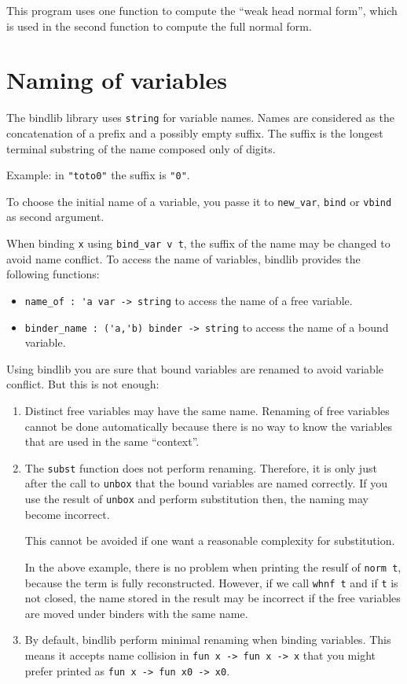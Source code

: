 \documentclass[11pt]{article}
\begin{document}
This program uses one function
to compute the ``weak head normal form'', which is used in the second
function to compute the full normal form.

\section{Naming of variables}

The bindlib library uses \verb#string# for variable names. Names are
considered
as the concatenation of a prefix and a possibly empty suffix. The
suffix is the longest terminal substring of the name composed only of
digits.

Example: in \verb#"toto0"# the suffix is \verb#"0"#.

To choose the initial name of a variable, you passe it to
\verb#new_var#, \verb#bind# or \verb#vbind# as second argument.

When binding \verb#x# using \verb#bind_var v t#, the suffix of
the name may be changed to avoid name conflict.
To access the name of variables, bindlib provides the following
functions:

\begin{itemize}
\item \verb#name_of : 'a var -> string# to access the name of a free
  variable.

\item \verb#binder_name : ('a,'b) binder -> string# to access the
  name of a bound variable.
\end{itemize}

Using bindlib you are sure that bound variables are renamed to avoid
variable conflict. But this is not enough:
\begin{enumerate}
\item Distinct free variables may have the same name. Renaming of free
  variables cannot be done automatically because there is no way to
  know the variables that are used in the same ``context''.

\item The \verb#subst# function does not perform renaming. Therefore,
  it is only just after the call to \verb#unbox# that the bound
  variables are named correctly. If you use the result of \verb#unbox#
  and perform substitution then, the naming may become incorrect.

  This cannot be avoided if one want a reasonable complexity for
  substitution.

  In the above example, there is no problem when printing the resulf
  of \verb#norm t#, because the term is fully reconstructed. However,
  if we call \verb#whnf t# and if \verb#t# is not closed, the name
  stored in the result may be incorrect if the free variables are
  moved under binders with the same name.

\item By default, bindlib perform minimal renaming when binding
  variables. This means it accepts name collision in
  \verb#fun x -> fun x -> x# that you might prefer printed as
  \verb#fun x -> fun x0 -> x0#.
\end{enumerate}
\end{document}
